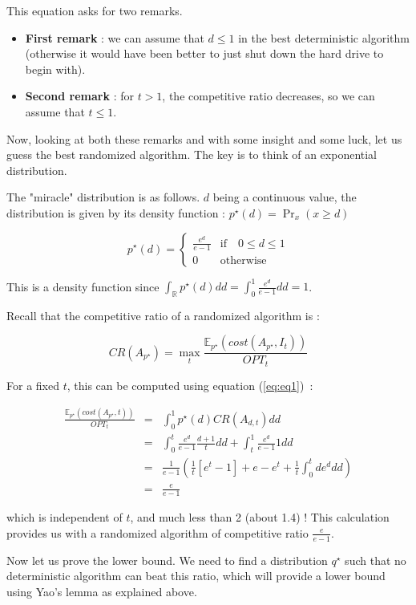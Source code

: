 This equation asks for two remarks.
\begin{itemize}
\item \textbf{First remark} : we can assume that $d \leq 1$ in the best deterministic algorithm (otherwise it would have been better to just shut down the hard drive to begin with).
\item \textbf{Second remark} : for $t >1$, the competitive ratio decreases, so we can assume that $t \leq 1$.
\end{itemize}

Now, looking at both these remarks and with some insight and some luck, let us guess the best randomized algorithm. The key is to think of an exponential distribution.

The "miracle" distribution is as follows. $d$ being a continuous value, the distribution is given by its density function : $p^\star(d) = \Pr_x(x \geq d)$

$$p^\star(d)= \left\{\begin{array}{ll} \frac{e^d}{e-1} & \text{if} \quad 0 \leq d \leq 1\\ 0 & \text{otherwise}\end{array}\right.$$

This is a density function since $\int_{\mathbb{R}} p^\star(d) d d = \int_0^1 \frac{e^d}{e-1}dd =1$.

Recall that the competitive ratio of a randomized algorithm is :

\[CR(A_{p^\star}) = \max_{t} \frac{ \mathbb{E}_{p^\star}(cost(A_{p^\star},I_t))}{OPT_t} \]


For a fixed $t$, this can be computed using equation (\ref{eq:eq1})~:

\begin{eqnarray*}
\frac{ \mathbb{E}_{p^\star}(cost(A_{p^\star},t))}{OPT_t}&=&\int_0^1 p^\star(d) CR(A_{d,t}) dd \\
&=& \int_0^t \frac{e^d}{e-1} \frac{d+1}{t}dd + \int_t^1 \frac{e^d}{e-1} 1 dd \\
&=& \frac{1}{e-1} ( \frac{1}{t} [e^t-1] + e-e^t + \frac{1}{t}\int_0^t de^d dd) \\
&=& \frac{e}{e-1}
\end{eqnarray*}

which is independent of $t$, and much less than 2 (about 1.4) ! This calculation provides us with a randomized algorithm of competitive ratio $\frac{e}{e-1}$.

\medskip

Now let us prove the lower bound. We need to find a distribution $q^\star$ such that no deterministic algorithm can beat this ratio, which will provide a lower bound using Yao's lemma as explained above.


